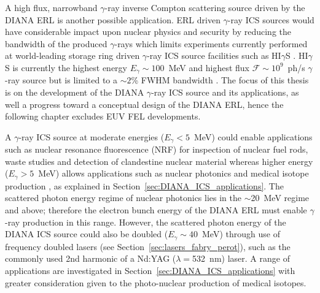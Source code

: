 \documentclass[../main.tex]{subfiles}
\begin{document}
A high flux, narrowband $\gamma$-ray inverse Compton scattering source driven by the DIANA ERL is another possible application. ERL driven $\gamma$-ray ICS sources would have considerable impact upon nuclear physics and security \cite{budker2021expanding} by reducing the bandwidth of the produced $\gamma$-rays which limits experiments currently performed at world-leading storage ring driven $\gamma$-ray ICS source facilities such as HI$\gamma$S \cite{weller2009research}. HI$\gamma$S is currently the highest energy $E_{\gamma} \sim 100$~\si{\mega\electronvolt} and highest flux $\mathcal{F} \sim 10^{9}$~ph/\si{\second} $\gamma$-ray source but is limited to a $\sim2$\% FWHM bandwidth \cite{weller2009research}.  The focus of this thesis is on the development of the DIANA $\gamma$-ray ICS source and its applications, as well a progress toward a conceptual design of the DIANA ERL, hence the following chapter excludes EUV FEL developments.

A $\gamma$-ray ICS source at moderate energies ($E_{\gamma} < 5$~\si{\mega\electronvolt}) could enable applications such as nuclear resonance fluorescence (NRF) for inspection of nuclear fuel rods, waste studies and detection of clandestine nuclear material \cite{angell2015demonstration,bolind2015states} whereas higher energy ($E_{\gamma} > 5$~\si{\mega\electronvolt}) allows applications such as nuclear photonics \cite{budker2021expanding} and medical isotope production \cite{habs2011production}, as explained in Section~\ref{sec:DIANA_ICS_applications}. The scattered photon energy regime of nuclear photonics lies in the $\sim$20~\si{\mega\electronvolt} regime and above; therefore the electron bunch energy of the DIANA ERL must enable $\gamma$-ray production in this range. However, the scattered photon energy of the DIANA ICS source could also be doubled ($E_{\gamma}\sim 40$~\si{\mega\electronvolt}) through use of frequency doubled lasers (see Section~\ref{sec:lasers_fabry_perot}), such as the commonly used 2nd harmonic of a Nd:YAG ($\lambda =$532~\si{\nano\meter}) laser. A range of applications are investigated in Section~\ref{sec:DIANA_ICS_applications} with greater consideration given to the photo-nuclear production of medical isotopes. 
\end{document}
